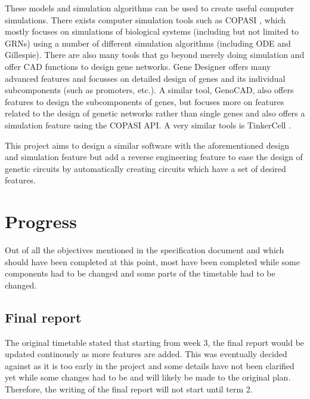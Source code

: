 \documentclass{article}
\begin{document}
	\par These models and simulation algorithms can be used to create useful computer simulations. There exists computer simulation tools such as COPASI \cite{copasi}, which mostly focuses on simulations of biological systems (including but not limited to GRNs) using a number of different simulation algorithms (including ODE and Gillespie). There are also many tools that go beyond merely doing simulation and offer CAD functions to design gene networks. Gene Designer \cite{gene_designer} offers many advanced features and focusses on detailed design of genes and its individual subcomponents (such as promoters, etc.). A similar tool, GenoCAD\cite{genocad}, also offers features to design the subcomponents of genes, but focuses more on features related to the design of genetic networks rather than single genes and also offers a simulation feature using the COPASI API. A very similar tools is TinkerCell \cite{tinkercell}. 
	\par This project aims to design a similar software with the aforementioned design and simulation feature but add a reverse engineering feature to ease the design of genetic circuits by automatically creating circuits which have a set of desired features.
	
	\section{Progress}
	
	Out of all the objectives mentioned in the specification document and which should have been completed at this point, most have been completed while some components had to be changed and some parts of the timetable had to be changed.
	
	\subsection{Final report} 
	The original timetable stated that starting from week 3, the final report would be updated continously as more features are added. This was eventually decided against as it is too early in the project and some details have not been clarified yet while some changes had to be and will likely be made to the original plan. Therefore, the writing of the final report will not start until term 2.
	
\end{document}
